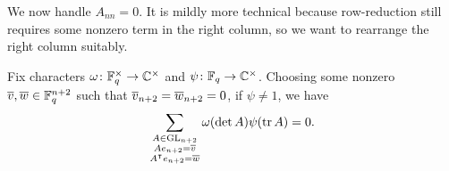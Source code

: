 We now handle $A_{nn}=0$. It is mildly more technical because row-reduction still requires some nonzero term in the right column, so we want to rearrange the right column suitably.
\begin{lemma} \label{lem:gsum-gl-0}
    Fix characters $\omega\colon\mathbb F_q^\times\to\mathbb C^\times$ and $\psi\colon\mathbb F_q\to\mathbb C^\times$. Choosing some nonzero $\overline{v},\overline{w}\in\mathbb F_q^{n+2}$ such that $\overline{v}_{n+2}=\overline{w}_{n+2}=0$, if $\psi\ne1$, we have
    \[\sum_{\substack{A\in\mathrm{GL}_{n+2}\\Ae_{n+2}=\overline{v}\\A^\intercal e_{n+2}=\overline{w}}}\omega(\det A)\psi(\operatorname{tr} A)=0.\]
\end{lemma}
